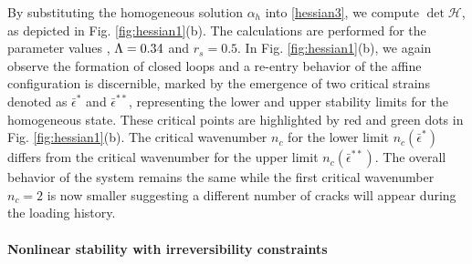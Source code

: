 By substituting the homogeneous solution $\alpha_h$ into \eqref{hessian3}, we compute $\det \mathcal{H}$, as depicted  in Fig. \ref{fig:hessian1}(b). The calculations are performed for the parameter values , $\Lambda=0.34$ and $r_s=0.5$.  In Fig. \ref{fig:hessian1}(b), we again observe the formation of closed loops and a re-entry behavior of the affine configuration is discernible, marked by the emergence of two critical strains denoted as $\bar\epsilon^*$ and $\bar\epsilon^{**}$, representing the lower and upper stability limits for the homogeneous state. These critical points are highlighted by red and green dots in Fig. \ref{fig:hessian1}(b). The critical wavenumber $n_c$ for the lower limit $n_c(\bar{\epsilon}^*)$    differs from the critical wavenumber for the upper limit $n_c(\bar{\epsilon}^{**})$. The overall behavior of the system remains the same while the first critical wavenumber $n_c=2$ is now smaller suggesting a different number of cracks will appear during the loading history.




% 

\paragraph{Nonlinear stability with irreversibility constraints}

